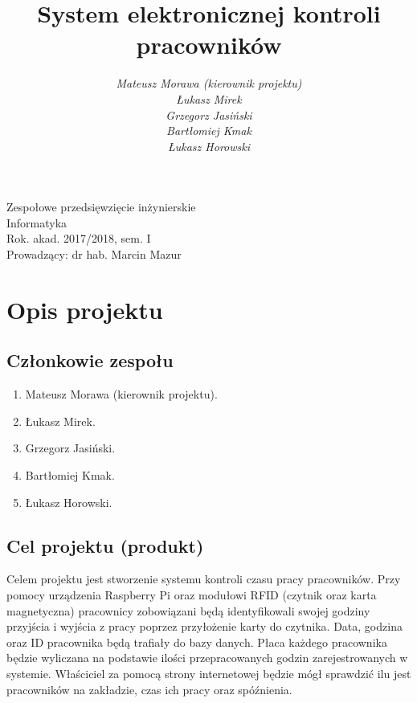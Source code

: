\documentclass[a4paper]{article}
\title{\bf{System elektronicznej kontroli pracowników}}
\author{{\em Mateusz Morawa (kierownik projektu)}\\
{\em Łukasz Mirek}\\
{\em Grzegorz Jasiński}\\
{\em Bartłomiej Kmak}\\
{\em Łukasz Horowski}\\
}
\date{}
\begin{document}
\begin{titlepage}
\maketitle
\thispagestyle{empty}
\bigskip
\begin{center}
Zespołowe przedsięwzięcie inżynierskie\\[2mm]

Informatyka\\[2mm]

Rok. akad. 2017/2018, sem. I\\[2mm]

Prowadzący: dr hab. Marcin Mazur
\end{center}
\end{titlepage}

\tableofcontents
\thispagestyle{empty}

\newpage

\section{Opis projektu}

\subsection{Członkowie zespołu}

\begin{enumerate}
\item Mateusz Morawa (kierownik projektu).
\item Łukasz Mirek.
\item Grzegorz Jasiński.
\item Bartłomiej Kmak.
\item Łukasz Horowski.
\end{enumerate}

\subsection{Cel projektu (produkt)}

Celem projektu jest stworzenie systemu kontroli czasu pracy pracowników. Przy pomocy urządzenia Raspberry Pi oraz modułowi RFID (czytnik oraz karta magnetyczna) pracownicy zobowiązani będą identyfikowali swojej godziny przyjścia i wyjścia z pracy poprzez przyłożenie karty do czytnika. Data, godzina oraz ID pracownika będą trafiały do bazy danych. Płaca każdego pracownika będzie wyliczana na podstawie ilości przepracowanych godzin zarejestrowanych w systemie. Właściciel za pomocą strony internetowej będzie mógł sprawdzić ilu jest  pracowników na zakładzie, czas ich pracy oraz spóźnienia.
\end{document}
